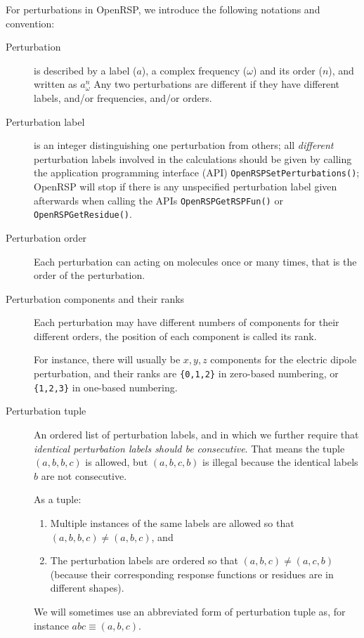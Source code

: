 For perturbations in OpenRSP, we introduce the following notations and
convention:
\begin{description}
  \item[Perturbation] is described by a label ($a$), a complex frequency
    ($\omega$) and its order ($n$), and written as $a_{\omega}^{n}$ Any
    two perturbations are different if they have different labels, and/or
    frequencies, and/or orders.
  \item[Perturbation label] is an integer distinguishing one perturbation
    from others; all \textit{different} perturbation labels involved in the
    calculations should be given by calling the application programming
    interface (API) \texttt{OpenRSPSetPerturbations()}; OpenRSP will stop if
    there is any unspecified perturbation label given afterwards when calling
    the APIs \texttt{OpenRSPGetRSPFun()} or \texttt{OpenRSPGetResidue()}.
  \item[Perturbation order] Each perturbation can acting on molecules once
    or many times, that is the order of the perturbation.
  \item[Perturbation components and their ranks] Each perturbation may have
    different numbers of components for their different orders, the position
    of each component is called its rank.

    For instance, there will usually be $x,y,z$ components for the electric
    dipole perturbation, and their ranks are \texttt{\{0,1,2\}} in zero-based
    numbering, or \texttt{\{1,2,3\}} in one-based numbering.
  \item[Perturbation tuple] An ordered list of perturbation labels, and in
    which we further require that \textit{identical perturbation labels should
    be consecutive}. That means the tuple $(a,b,b,c)$ is allowed, but $(a,b,c,b)$
    is illegal because the identical labels $b$ are not consecutive.

    As a tuple:
    \begin{enumerate}
      \item Multiple instances of the same labels are allowed so that
        $(a,b,b,c)\ne(a,b,c)$, and
      \item The perturbation labels are ordered so that $(a,b,c)\ne(a,c,b)$
        (because their corresponding response functions or residues are in
        different shapes).
    \end{enumerate}
    We will sometimes use an abbreviated form of perturbation tuple as,
    for instance $abc\equiv(a,b,c)$.


\end{description}
